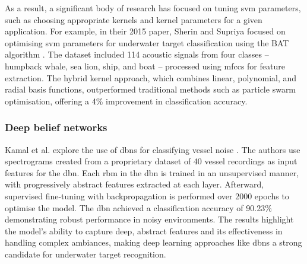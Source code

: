 As a result, a significant body of research has focused on tuning \acrshort{svm} parameters, such as choosing appropriate kernels and kernel parameters for a given application. For example, in their 2015 paper, Sherin and Supriya \cite{sherin_b_m_selection_2015} focused on optimising \acrshort{svm} parameters for underwater target classification using the BAT algorithm \cite{kacprzyk_new_2010}. The dataset included 114 acoustic signals from four classes -- humpback whale, sea lion, ship, and boat -- processed using \acrshort{mfcc}s for feature extraction. The hybrid kernel approach, which combines linear, polynomial, and radial basis functions, outperformed traditional methods such as particle swarm optimisation, offering a 4\% improvement in classification accuracy. 


\subsubsection{Deep belief networks}

Kamal et al. explore the use of \acrlong{dbn}s for classifying vessel noise \cite{kamal_deep_2013}. The authors use spectrograms created from a proprietary dataset of 40 vessel recordings as input features for the \acrshort{dbn}. Each \acrshort{rbm} in the \acrshort{dbn} is trained in an unsupervised manner, with progressively abstract features extracted at each layer. Afterward, supervised fine-tuning with backpropagation is performed over 2000 epochs to optimise the model. The \acrshort{dbn} achieved a classification accuracy of 90.23\% demonstrating robust performance in noisy environments. The results highlight the model's ability to capture deep, abstract features and its effectiveness in handling complex ambiances, making deep learning approaches like \acrshort{dbn}s a strong candidate for underwater target recognition.

